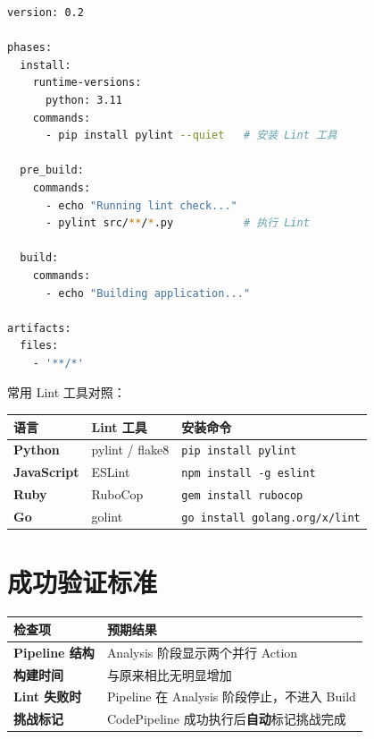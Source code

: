 \documentclass[12pt, a4paper]{article}
\begin{document}
\begin{lstlisting}[language=bash, caption=buildspec.yml 中集成 Lint 示例]
version: 0.2

phases:
  install:
    runtime-versions:
      python: 3.11
    commands:
      - pip install pylint --quiet   # 安装 Lint 工具

  pre_build:
    commands:
      - echo "Running lint check..."
      - pylint src/**/*.py           # 执行 Lint

  build:
    commands:
      - echo "Building application..."

artifacts:
  files:
    - '**/*'
\end{lstlisting}

常用 Lint 工具对照：

\begin{center}
\begin{tabular}{>{\bfseries}p{3cm} p{3cm} p{6cm}}
    \toprule
    语言 & Lint 工具 & 安装命令 \\
    \midrule
    Python & pylint / flake8 & \texttt{pip install pylint} \\
    JavaScript & ESLint & \texttt{npm install -g eslint} \\
    Ruby & RuboCop & \texttt{gem install rubocop} \\
    Go & golint & \texttt{go install golang.org/x/lint} \\
    \bottomrule
\end{tabular}
\end{center}

\section{成功验证标准}

\begin{center}
\begin{tabular}{>{\bfseries}p{4cm} p{8cm}}
    \toprule
    检查项 & 预期结果 \\
    \midrule
    Pipeline 结构 & Analysis 阶段显示两个并行 Action \\
    构建时间 & 与原来相比无明显增加 \\
    Lint 失败时 & Pipeline 在 Analysis 阶段停止，不进入 Build \\
    挑战标记 & CodePipeline 成功执行后\textbf{自动}标记挑战完成 \\
    \bottomrule
\end{tabular}
\end{center}
\end{document}
